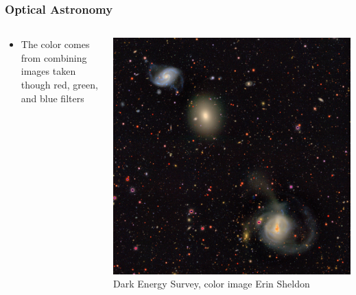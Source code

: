 \documentclass{beamer}
\begin{document}
\frame
{

    \frametitle{Optical Astronomy}


    \begin{columns}
        \begin{column}{0.4\textwidth}
            \begin{itemize}


                \item The color comes from combining images taken though red,
                    green, and blue filters


            \end{itemize}
        \end{column}
        \begin{column}{0.6\textwidth}
            \begin{center}
                \includegraphics[width=\textwidth]{DES0428-4748_gri_sv_mask_streaks_color_trim.jpg}
                \newline
                {\tiny Dark Energy Survey, color image Erin Sheldon}
            \end{center}

            
        \end{column}
    \end{columns}


}
\end{document}
